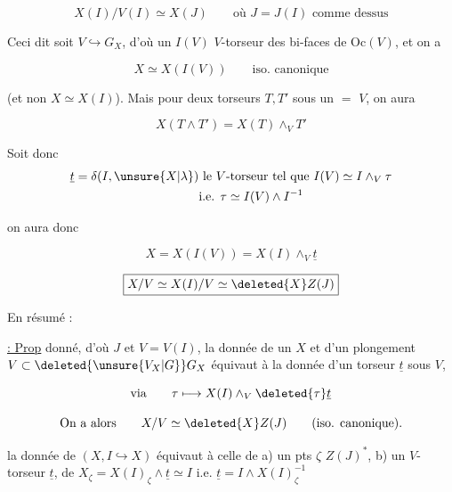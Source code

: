 
\[
X(I)/V(I)\simeq X(J)\qquad\text{où }J=J(I)\text{ comme dessus}
\]

Ceci dit soit  $V\hookrightarrow G_X$, d'où un $I(V)$ $V$-torseur des bi-faces de $\mathrm{Oc}(V)$, et on a 

\[
X\simeq X(I(V))\qquad\text{iso. canonique}
\]

(et non $X\simeq X(I)$). Mais pour  deux torseurs $T,T'$ sous un $=$ $V$, on aura

\[
X(T\wedge T')=X(T)\wedge_V T'
\]


Soit donc
\[
\begin{aligned}
\underline{t}=\delta(I,\unsure{X|\lambda})&\text{ le }V\text{-torseur tel que }I(V)\simeq I\wedge_V\tau\\
&\text{i.e. }\tau\simeq I(V)\wedge I^{-1}
\end{aligned}
\]

on aura donc

\[
\boxed{X=X(I(V))=X(I)\wedge_V\underline t}
\]

  

\[
\boxed{X/V\simeq X(I)/V\simeq \deleted{X}Z(J)}
\]

En résumé :

\uline{ : Prop}   donné, d'où $J$ et $V=V(I)$, la donnée de un $X$ et d'un plongement $V\subset \deleted{\unsure{V_X|G}}G_X$ équivaut à la donnée d'un torseur $\underline t$ sous $V$,

\[
\text{via}\qquad \tau\longmapsto X(I)\wedge_V\deleted{\tau}\underline t
\]

\[
\text{On a alors}\qquad X/V\simeq\deleted{X}Z(J)\qquad\text{(iso. canonique).}
\]

  la donnée de $(X,I\hookrightarrow X)$ équivaut à celle de a) un pts $\zeta$  $Z(J)^*$, b) un $V$-torseur $\underline t$,    de  $X_\zeta=X(I)_\zeta\wedge\underline t\simeq I$ i.e. $\underline t=I\wedge X(I)_\zeta^{-1}$
